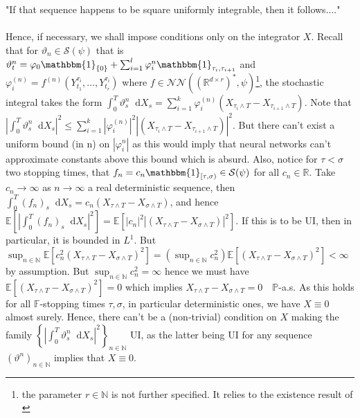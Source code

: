 \documentclass[11pt]{report}
\newcommand{\diff}{\mathop{}\!\mathrm{d}}
\theoremstyle{plain} %
\theoremstyle{definition} %
\theoremstyle{remark} %
\begin{document}
\\\\
"If that sequence happens to be square uniformly integrable, then it follows...."
\\\\
Hence, if necessary, we shall impose conditions only on the integrator \(X\). Recall that for \(\vartheta_n\in\mathcal{S}(\psi)\) that is \(\vartheta^n_t=\varphi_0\mathbbm{1}_{\{0\}}+\sum_{i=1}^l\varphi_i^n\mathbbm{1}_{\tau_i,\tau_{i+1}}\) and \(\varphi_i^{(n)}=f^{(n)}(Y^{\tau_i}_{t_1},\dots,Y^{\tau_i}_{t_r})\) where \(f\in\mathcal{NN}((\mathbb{R}^{d\times r})^*,\psi)\)\footnote{the parameter \(r\in\mathbb{N}\) is not further specified. It relies to the existence result of \parencite[Thm.~5.23.]{Arandjelovic2025}}, the stochastic integral takes the form \(\int_0^T\vartheta^n_s\diff X_s = \sum_{i=1}^k \varphi^{(n)}_i(X_{\tau_i\wedge T}-X_{\tau_{i+1}\wedge T})\). Note that \(\left|\int_0^T\vartheta^n_s\diff X_s\right|^2 \leq \sum_{i=1}^k \left|\varphi^{(n)}_i\right|^2\left|(X_{\tau_i\wedge T}-X_{\tau_{i+1}\wedge T})\right|^2\). But there can't exist a uniform bound (in n) on \(|\varphi_i^n|\) as this would imply that neural networks can't approximate constants above this bound which is absurd. Also, notice for \(\tau<\sigma\) two stopping times, that \(f_n = c_n\mathbbm{1}_{[\tau,\sigma)}\in\mathcal{S}(\psi)\) for all \(c_n\in\mathbb{R}\). Take \(c_n\to\infty\) as \(n\to\infty\) a real deterministic sequence, then \(\int_0^T(f_n)_s\diff X_s=c_n(X_{\tau\wedge T}-X_{\sigma\wedge T})\), and hence \(\mathbb{E}[\left|\int_0^T(f_n)_s\diff X_s\right|^2]=\mathbb{E}[\left|c_n\right|^2\left|(X_{\tau\wedge T}-X_{\sigma\wedge T})\right|^2]\). If this is to be UI, then in particular, it is bounded in \(L^1\). But \(\sup_{n\in\mathbb{N}}\mathbb{E}[c_n^2(X_{\tau\wedge T}-X_{\sigma\wedge T})^2]=(\sup_{n\in\mathbb{N}}c_n^2)\mathbb{E}[(X_{\tau\wedge T}-X_{\sigma\wedge T})^2]<\infty\) by assumption. But \(\sup_{n\in\mathbb{N}}c_n^2=\infty\) hence we must have \(\mathbb{E}[(X_{\tau\wedge T}-X_{\sigma\wedge T})^2]=0\) which implies \(X_{\tau\wedge T}-X_{\sigma\wedge T}=0\quad\mathbb{P}\)-a.s. As this holds for all \(\mathbb{F}\)-stopping times \(\tau,\sigma\), in particular deterministic ones, we have \(X\equiv 0\) almost surely. Hence, there can't be a (non-trivial) condition on \(X\) making the family \(\left\{\left|\int_{0}^T\vartheta_s^n\diff X_s\right|^2\right\}_{n\in\mathbb{N}}\) UI, as the latter being UI for any sequence \((\vartheta^n)_{n\in\mathbb{N}}\) implies that \(X\equiv 0\).
\bigbreak
\end{document}
